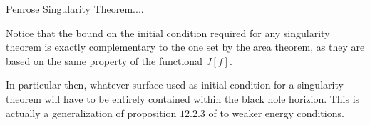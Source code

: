 
Penrose Singularity Theorem....

\begin{remark}
    Notice that the bound on the initial condition required for any singularity theorem is exactly complementary to the one set by the area theorem, as they are based on the same property of the functional \(J[f]\).

    In particular then, whatever surface used as initial condition for a singularity theorem will have to be entirely contained within the black hole horizion.
    This is actually a generalization of proposition \(12.2.3\) of \cite{wald2010general} to weaker energy conditions.
\end{remark}

	
	
	
	
	
	

	
	
	
	
	



